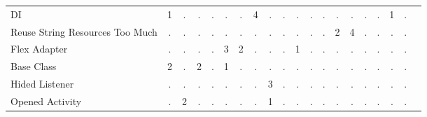 \begin{table*}[t]
\begin{tabular}{p{4cm}|p{.3cm}p{.3cm}p{.3cm}p{.3cm}p{.3cm}p{.3cm}p{.3cm}p{.3cm}p{.3cm}p{.4cm}p{.4cm}p{.4cm}p{.4cm}p{.4cm}p{.4cm}p{.4cm}p{.4cm}p{.4cm}p{.4cm}}
DI											& \multicolumn{1}{c}{1}	& \multicolumn{1}{c}{.}	& \multicolumn{1}{c}{.}	& \multicolumn{1}{c}{.}	& \multicolumn{1}{c}{.}	& \multicolumn{1}{c}{.}	& \multicolumn{1}{c}{4}	& \multicolumn{1}{c}{.}	& \multicolumn{1}{c}{.}	& \multicolumn{1}{c}{.}	& \multicolumn{1}{c}{.}	& \multicolumn{1}{c}{.}	& \multicolumn{1}{c}{.}	& \multicolumn{1}{c}{.}	& \multicolumn{1}{c}{.}	& \multicolumn{1}{c}{.}	& \multicolumn{1}{c}{1}	& \multicolumn{1}{c}{.} 		 \\
Reuse String Resources Too Much				& \multicolumn{1}{c}{.}	& \multicolumn{1}{c}{.}	& \multicolumn{1}{c}{.}	& \multicolumn{1}{c}{.}	& \multicolumn{1}{c}{.}	& \multicolumn{1}{c}{.}	& \multicolumn{1}{c}{.}	& \multicolumn{1}{c}{.}	& \multicolumn{1}{c}{.}	& \multicolumn{1}{c}{.}	& \multicolumn{1}{c}{.}	& \multicolumn{1}{c}{.}	& \multicolumn{1}{c}{2}	& \multicolumn{1}{c}{4}	& \multicolumn{1}{c}{.}	& \multicolumn{1}{c}{.}	& \multicolumn{1}{c}{.}	& \multicolumn{1}{c}{.} 		 \\
Flex Adapter								& \multicolumn{1}{c}{.}	& \multicolumn{1}{c}{.}	& \multicolumn{1}{c}{.}	& \multicolumn{1}{c}{.}	& \multicolumn{1}{c}{3}	& \multicolumn{1}{c}{2}	& \multicolumn{1}{c}{.}	& \multicolumn{1}{c}{.}	& \multicolumn{1}{c}{.}	& \multicolumn{1}{c}{1}	& \multicolumn{1}{c}{.}	& \multicolumn{1}{c}{.}	& \multicolumn{1}{c}{.}	& \multicolumn{1}{c}{.}	& \multicolumn{1}{c}{.}	& \multicolumn{1}{c}{.}	& \multicolumn{1}{c}{.}	& \multicolumn{1}{c}{.} 		 \\
Base Class									& \multicolumn{1}{c}{2}	& \multicolumn{1}{c}{.}	& \multicolumn{1}{c}{2}	& \multicolumn{1}{c}{.}	& \multicolumn{1}{c}{1}	& \multicolumn{1}{c}{.}	& \multicolumn{1}{c}{.}	& \multicolumn{1}{c}{.}	& \multicolumn{1}{c}{.}	& \multicolumn{1}{c}{.}	& \multicolumn{1}{c}{.}	& \multicolumn{1}{c}{.}	& \multicolumn{1}{c}{.}	& \multicolumn{1}{c}{.}	& \multicolumn{1}{c}{.}	& \multicolumn{1}{c}{.}	& \multicolumn{1}{c}{.}	& \multicolumn{1}{c}{.} 		 \\
Hided Listener								& \multicolumn{1}{c}{.}	& \multicolumn{1}{c}{.}	& \multicolumn{1}{c}{.}	& \multicolumn{1}{c}{.}	& \multicolumn{1}{c}{.}	& \multicolumn{1}{c}{.}	& \multicolumn{1}{c}{.}	& \multicolumn{1}{c}{3}	& \multicolumn{1}{c}{.}	& \multicolumn{1}{c}{.}	& \multicolumn{1}{c}{.}	& \multicolumn{1}{c}{.}	& \multicolumn{1}{c}{.}	& \multicolumn{1}{c}{.}	& \multicolumn{1}{c}{.}	& \multicolumn{1}{c}{.}	& \multicolumn{1}{c}{.}	& \multicolumn{1}{c}{.} 		 \\
Opened Activity								& \multicolumn{1}{c}{.}	& \multicolumn{1}{c}{2}	& \multicolumn{1}{c}{.}	& \multicolumn{1}{c}{.}	& \multicolumn{1}{c}{.}	& \multicolumn{1}{c}{.}	& \multicolumn{1}{c}{.}	& \multicolumn{1}{c}{1}	& \multicolumn{1}{c}{.}	& \multicolumn{1}{c}{.}	& \multicolumn{1}{c}{.}	& \multicolumn{1}{c}{.}	& \multicolumn{1}{c}{.}	& \multicolumn{1}{c}{.}	& \multicolumn{1}{c}{.}	& \multicolumn{1}{c}{.}	& \multicolumn{1}{c}{.}	& \multicolumn{1}{c}{.} 		 \\

\end{tabular}
\end{table*}
